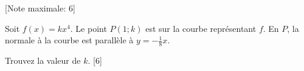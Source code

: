 \begin{question}
  \hspace*{\fill} [Note maximale: 6]\par
  \medskip
  \noindent Soit $f(x) = kx^4$. Le point $P(1 ; k)$ est sur la courbe représentant $f$. En $P$, la normale à la courbe est parallèle à $y = -\frac{1}{8}x$.\par
  \medskip
  Trouvez la valeur de $k$.\hspace*{\fill} [6]\par
\end{question}
